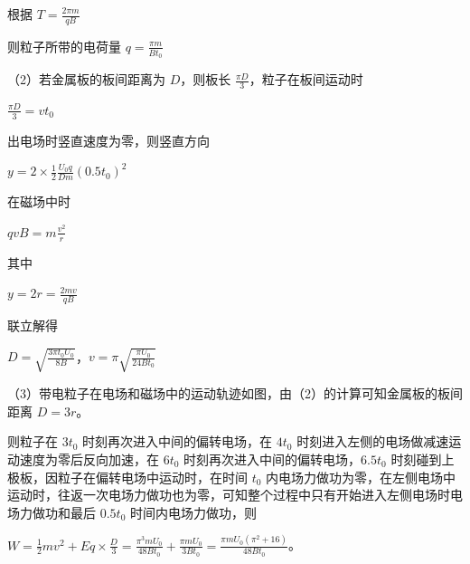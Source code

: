\documentclass[\gkver]{gaokaozhenti}
\begin{document}
\begin{enumerate}
{根据 $T=\frac{2\pi m}{qB}$

则粒子所带的电荷量 $q=\frac{\pi m}{Bt_{0}}$

（2）若金属板的板间距离为 $D$，则板长 $\frac{\pi D}{3}$，粒子在板间运动时

$\frac{\pi D}{3}=v t_{0}$

出电场时竖直速度为零，则竖直方向

$y=2\times\frac{1}{2}\frac{U_{0}q}{Dm}(0.5t_{0})^{2}$

在磁场中时

$qvB=m\frac{v^{2}}{r}$

其中

$y=2r=\frac{2mv}{qB}$

联立解得

$D=\sqrt{\frac{3\pi t_{0}U_{0}}{8B}}$，$v=\pi\sqrt{\frac{\pi U_{0}}{24Bt_{0}}}$

（3）带电粒子在电场和磁场中的运动轨迹如图，由（2）的计算可知金属板的板间距离 $D = 3r$。


则粒子在 $3t_{0}$ 时刻再次进入中间的偏转电场，在 $4t_{0}$ 时刻进入左侧的电场做减速运动速度为零后反向加速，在 $6t_{0}$ 时刻再次进入中间的偏转电场，$6.5t_{0}$ 时刻碰到上极板，因粒子在偏转电场中运动时，在时间 $t_{0}$ 内电场力做功为零，在左侧电场中运动时，往返一次电场力做功也为零，可知整个过程中只有开始进入左侧电场时电场力做功和最后 $0.5t_{0}$ 时间内电场力做功，则

$W=\frac{1}{2}mv^{2}+Eq\times\frac{D}{3}=\frac{\pi^{3}mU_{0}}{48Bt_{0}}+\frac{\pi mU_{0}}{3Bt_{0}}=\frac{\pi mU_{0}(\pi^{2}+16)}{48Bt_{0}}$。
}

\end{enumerate}
\end{document}
